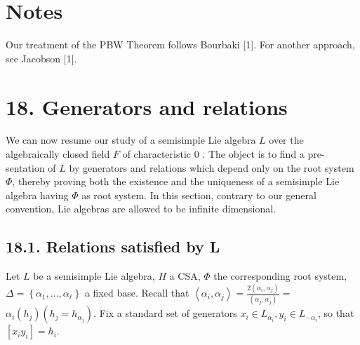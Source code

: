 \documentclass[10pt]{article}
\begin{document}
\section*{Notes}
Our treatment of the PBW Theorem follows Bourbaki [1]. For another approach, see Jacobson [1].

\section*{18. Generators and relations}
We can now resume our study of a semisimple Lie algebra $L$ over the algebraically closed field $F$ of characteristic 0 . The object is to find a pre-\\
sentation of $L$ by generators and relations which depend only on the root system $\Phi$, thereby proving both the existence and the uniqueness of a semisimple Lie algebra having $\Phi$ as root system. In this section, contrary to our general convention, Lie algebras are allowed to be infinite dimensional.

\subsection*{18.1. Relations satisfied by L}
Let $L$ be a semisimple Lie algebra, $H$ a CSA, $\Phi$ the corresponding root system, $\Delta=\left\{\alpha_{1}, \ldots, \alpha_{\ell}\right\}$ a fixed base. Recall that $\left\langle\alpha_{i}, \alpha_{j}\right\rangle=\frac{2\left(\alpha_{i}, \alpha_{j}\right)}{\left(\alpha_{j}, \alpha_{j}\right)}=$ $\alpha_{i}\left(h_{j}\right)\left(h_{j}=h_{\alpha_{j}}\right)$. Fix a standard set of generators $x_{i} \in L_{\alpha_{i}}, y_{i} \in L_{-\alpha_{i}}$, so that $\left[x_{i} y_{i}\right]=h_{i}$.
\end{document}
